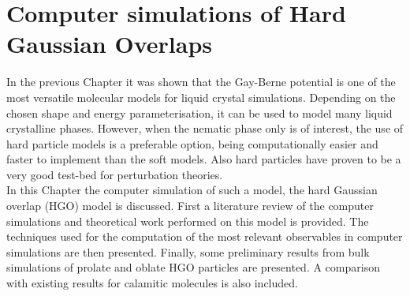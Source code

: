 
%


\chapter{Computer simulations of Hard Gaussian Overlaps}
\label{chap:three}


\introduction

In the previous Chapter it was shown that the Gay-Berne potential is one of the most versatile 
molecular models for liquid crystal simulations. Depending on the chosen shape and energy 
parameterisation, it can be used to model many liquid crystalline phases. 
However, when the nematic phase only is of interest, the use of
hard particle models is a preferable option, being computationally easier and faster to
implement than the soft models. Also hard particles have proven to be a very good test-bed
for perturbation theories.\\
In this Chapter the computer simulation of such a model, the hard Gaussian overlap (HGO) 
model is discussed.  First a literature review of the computer simulations and theoretical 
work performed on  this model is provided. The techniques used for the computation of the most
relevant observables in computer simulations are then presented. Finally, some preliminary
results from bulk simulations of prolate and oblate HGO particles 
are presented.  A comparison with existing results for calamitic molecules is also included.




